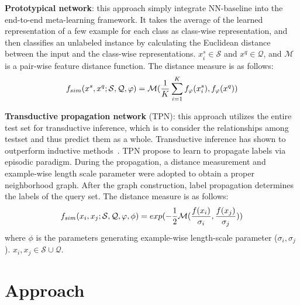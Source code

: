 \documentclass[a4paper]{article}
\begin{document}
\textbf{Prototypical network}: this approach simply integrate
NN-baseline into the end-to-end meta-learning framework. It takes the average of the learned representation of a few example for each class as class-wise representation, and then classifies an unlabeled instance
by calculating the Euclidean distance between the input
and the class-wise representations. $x^s_i \in \mathcal{S}$ and $x^q \in \mathcal{Q}$, and $\mathcal{M}$ is a pair-wise feature distance function. The distance measure is as follows:
\vspace{-1.5mm}
\begin{equation}
f_{sim}(x^s, x^q;\mathcal{S},\mathcal{Q},\varphi) =  \mathcal{M}(  \frac{1}{K}\sum_{i=1}^{K}f_\varphi(x^s_i),f_\varphi(x^q))
\vspace{-2mm}
\end{equation}

\textbf{Transductive propagation network} (TPN): this approach utilizes the entire test set for transductive inference, which is to consider the relationships among testset and thus predict them as a whole. Transductive inference has shown to outperform inductive methods~\cite{TSVM,TPNzero}. TPN propose to learn to propagate labels via episodic paradigm. During the propagation, a distance measurement and example-wise length scale parameter were adopted to obtain a proper neighborhood graph. After the graph construction, label propagation determines the labels of the query set. The distance measure is as follows:
\vspace{-2.5mm}
\begin{equation}
f_{sim}(x_i, x_j;\mathcal{S},\mathcal{Q},\varphi,\phi) = exp( -\frac{1}{2}\mathcal{M}(\frac{f(x_i)}{\sigma_{i}} ,\frac{f(x_j)}{\sigma_{j}}))
\vspace{-2.5mm}
\end{equation}
where $\phi$ is the parameters generating example-wise length-scale parameter ($\sigma_{i}, \sigma_{j}$). $x_i,x_j \in \mathcal{S} \cup \mathcal{Q}$.

\section{Approach}
\end{document}
